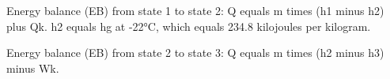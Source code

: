 Energy balance (EB) from state 1 to state 2:  
Q equals m times (h1 minus h2) plus Qk.  
h2 equals hg at -22°C, which equals 234.8 kilojoules per kilogram.  

Energy balance (EB) from state 2 to state 3:  
Q equals m times (h2 minus h3) minus Wk.